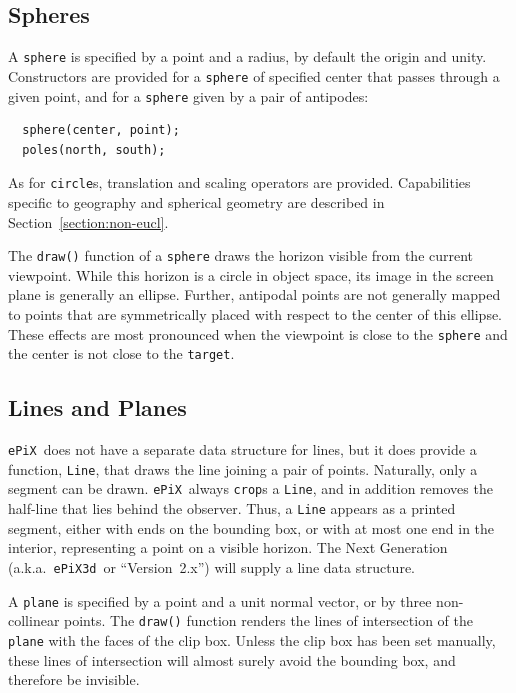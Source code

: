 \documentclass[12pt]{report}
\newcommand{\code}[1]{\texttt{#1}}
\newcommand{\ePiX}{\code{ePiX}}
\begin{document}
\subsection*{Spheres}

A \code{sphere} is specified by a point and a radius, by default the
origin and unity. Constructors are provided for a \code{sphere} of
specified center that passes through a given point, and for a
\code{sphere} given by a pair of antipodes:
\begin{verbatim}
  sphere(center, point);
  poles(north, south);
\end{verbatim}
As for \code{circle}s, translation and scaling operators are provided.
Capabilities specific to geography and spherical geometry are
described in Section~\ref{section:non-eucl}.
  
The \code{draw()} function of a \code{sphere} draws the horizon
visible from the current viewpoint. While this horizon is a circle in
object space, its image in the screen plane is generally an ellipse.
Further, antipodal points are not generally mapped to points that are
symmetrically placed with respect to the center of this ellipse. These
effects are most pronounced when the viewpoint is close to the
\code{sphere} and the center is not close to the \code{target}.

  
\subsection*{Lines and Planes}

\ePiX\ does not have a separate data structure for lines, but it does
provide a function, \code{Line}, that draws the line joining a pair of
points. Naturally, only a segment can be drawn. \ePiX\ always
\code{crop}s a \code{Line}, and in addition removes the half-line that
lies behind the observer. Thus, a \code{Line} appears as a printed
segment, either with ends on the bounding box, or with at most one end
in the interior, representing a point on a visible horizon. The Next
Generation (a.k.a.\ \code{ePiX3d}~or ``Version~2.x'') will supply a
line data structure.

A \code{plane} is specified by a point and a unit normal vector, or by
three non-collinear points. The \code{draw()} function renders the
lines of intersection of the \code{plane} with the faces of the
clip box. Unless the clip box has been set manually, these lines of
intersection will almost surely avoid the bounding box, and therefore
be invisible.
\end{document}
